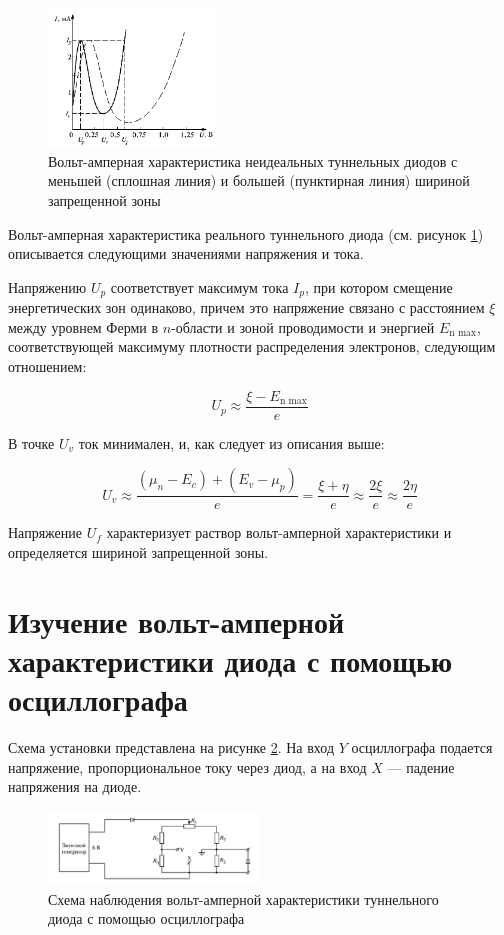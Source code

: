\documentclass[12pt]{kiarticle} %
\begin{document}
	\begin{figure}[h]
		\centering	
		\includegraphics[width=0.4\textwidth]{not_ideal.png}
		\caption{Вольт-амперная характеристика неидеальных туннельных диодов с меньшей (сплошная линия) и большей (пунктирная линия) шириной запрещенной зоны}
		\label{pic:not_ideal}
	\end{figure}  
	
	Вольт-амперная характеристика реального туннельного диода (см. рисунок \ref{pic:not_ideal}) описывается следующими значениями напряжения и тока. 
	
	Напряжению $U_p$ соответствует максимум тока $I_p$, при котором смещение энергетических зон одинаково, причем это напряжение связано с расстоянием $\xi$ между уровнем Ферми в $n$-области и зоной проводимости и энергией $E_\text{n max}$, соответствующей максимуму плотности распределения электронов, следующим отношением: 
	
	\[ U_p \approx \frac{\xi - E_\text{n max}}{e} \]
	
	В точке $U_v$ ток минимален, и, как следует из описания выше:
	
	\[ U_v \approx \frac{(\mu_n - E_c) + (E_v - \mu_p)}{e} = \frac{\xi + \eta}{e} \approx \frac{2\xi}{e} \approx \frac{2\eta}{e} \]
	
	Напряжение $U_f$ характеризует раствор вольт-амперной характеристики и определяется шириной запрещенной зоны. 


	\section{Изучение вольт-амперной характеристики диода с помощью осциллографа}
	
	Схема установки представлена на рисунке \ref{pic:scheme_oscil}. На вход $ Y $ осциллографа подается напряжение, пропорциональное току через диод, а на вход $ X $ --- падение напряжения на диоде.
	
	\begin{figure}[h]
		\centering	
		\includegraphics[width=0.5\textwidth]{scheme_oscil.png}
		\caption{Схема наблюдения вольт-амперной характеристики туннельного диода с помощью осциллографа}
		\label{pic:scheme_oscil}
	\end{figure}
	
\end{document}
